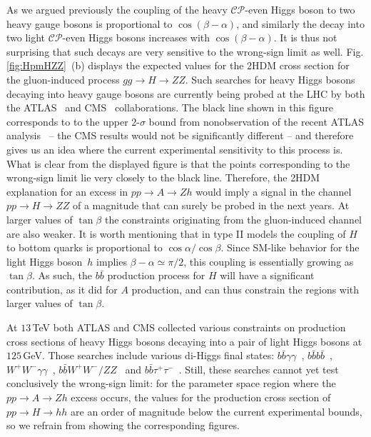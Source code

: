 \documentclass[12pt]{article}
\newcommand{\abbrev}{\scalefont{.9}}
\newcommand{\fig}[1]{Fig.\,\ref{#1}}
\newcommand{\lhc}{{\abbrev LHC}}
\newcommand{\sm}{{\abbrev SM}}
\newcommand{\thdm}{{\abbrev 2HDM}}
\newcommand{\atlas}{{\abbrev ATLAS}}
\newcommand{\cms}{{\abbrev CMS}}
\newcommand{\cp}{{\abbrev $\mathcal{CP}$}}
\begin{document}
As we argued previously
the coupling of the heavy \cp{}-even Higgs boson to two heavy gauge bosons is proportional
to $\cos(\beta-\alpha)$, and similarly the decay into two light \cp{}-even Higgs bosons
increases with $\cos(\beta-\alpha)$. It is thus not surprising that such
decays are very sensitive to the wrong-sign limit as well.
\fig{fig:HpmHZZ}~(b) displays the expected values for the \thdm{} cross section
for the gluon-induced process $gg\to H \to ZZ$. Such searches for heavy Higgs bosons
decaying into heavy gauge bosons are currently being probed at the
\lhc{} by both the \atlas{}~\cite{Aaboud:2017fgj,Aaboud:2017itg,Aaboud:2017gsl,ATLAS-CONF-2016-079,ATLAS-CONF-2017-058}
and \cms{}~\cite{CMS-PAS-HIG-16-001,CMS-PAS-HIG-16-033,CMS-PAS-HIG-16-034} collaborations.
The black line shown in this figure corresponds to to the upper $2$-$\sigma$ bound from nonobservation
of the recent \atlas{} analysis~\cite{ATLAS-CONF-2017-058} -- the \cms{} results would not be significantly
different -- and therefore gives us an idea where the current experimental
sensitivity to this process is. What is clear from the displayed figure is that the points
corresponding to the wrong-sign limit lie very closely to the black line. Therefore, the \thdm{} explanation for an
excess in $pp\to A \to Zh$ would imply a signal in the channel
$pp\to H \to ZZ$ of a magnitude that can surely be probed in the next years.
At larger values of $\tan\beta$ the constraints originating from the gluon-induced
channel are also weaker. It is worth
mentioning that in type II models the coupling of $H$ to bottom quarks is proportional to
$\cos\alpha/\cos\beta$. Since \sm{}-like behavior for the light Higgs boson~$h$ implies $\beta - \alpha \simeq \pi/2$,
this coupling is essentially growing as $\tan\beta$. As such, the $b\bar{b}$ production
process for $H$ will have a significant contribution, as it did for $A$ production,
and can thus constrain the regions with larger values of $\tan\beta$.

At $13$\,TeV both \atlas{} and \cms{} collected various constraints on
production cross sections of heavy Higgs bosons decaying into a pair of light Higgs
bosons at $125$\,GeV. Those searches include various di-Higgs final states:
$b\bar b\gamma\gamma$~\cite{ATLAS-CONF-2016-004,CMS-PAS-HIG-17-008},
$b\bar bb\bar b$~\cite{Aaboud:2016xco,CMS-PAS-B2G-16-026,ATLAS-CONF-2016-049}, $W^+W^- \gamma\gamma$~\cite{ATLAS-CONF-2016-071},
$b\bar b W^+W^-/ZZ$~\cite{Sirunyan:2017guj} and $b\bar b\tau^+\tau^-$~\cite{Sirunyan:2017djm}.
Still, these searches cannot yet test conclusively the wrong-sign limit:
for the parameter space region where the $pp\to A \to Zh$ excess occurs, the values for
the production cross section of $pp \to H \to hh$  are an order of magnitude below the current
experimental bounds, so we refrain from showing the corresponding figures.
\end{document}
